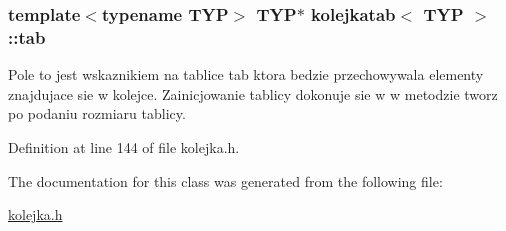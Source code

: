 \hypertarget{classkolejkatab_a91ec1706d1e10ce7f781a5102c4b59b8}{
\subsubsection[{tab}]{\setlength{\rightskip}{0pt plus 5cm}template$<$typename T\-Y\-P$>$ T\-Y\-P$\ast$ {\bf kolejkatab}$<$ T\-Y\-P $>$\-::tab}}\label{classkolejkatab_a91ec1706d1e10ce7f781a5102c4b59b8}
Pole to jest wskaznikiem na tablice tab ktora bedzie przechowywala elementy znajdujace sie w kolejce. Zainicjowanie tablicy dokonuje sie w w metodzie tworz po podaniu rozmiaru tablicy. 

Definition at line 144 of file kolejka.\-h.



The documentation for this class was generated from the following file\-:\begin{DoxyCompactItemize}
\item 
\hyperlink{kolejka_8h}{kolejka.\-h}\end{DoxyCompactItemize}
